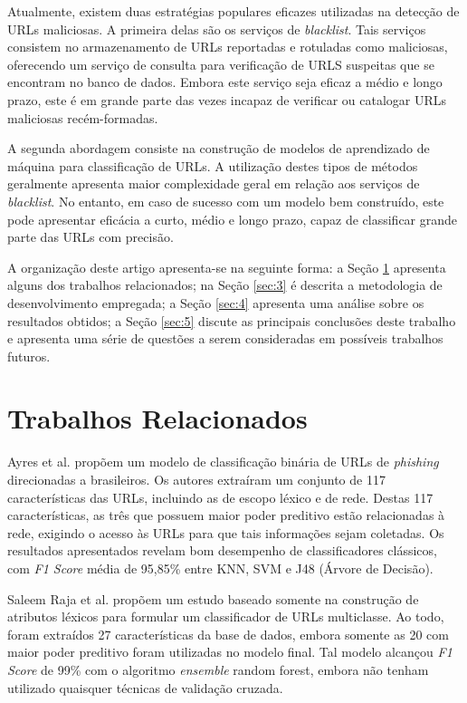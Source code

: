 \documentclass[manuscript,screen,review]{acmart}
\begin{document}

Atualmente, existem duas estratégias populares eficazes utilizadas na detecção de URLs maliciosas. A primeira delas são os serviços de \emph{blacklist}. Tais serviços consistem no armazenamento de URLs reportadas e rotuladas como maliciosas, oferecendo um serviço de consulta para verificação de URLS suspeitas que se encontram no banco de dados. Embora este serviço seja eficaz a médio e longo prazo, este é em grande parte das vezes incapaz de verificar ou catalogar URLs maliciosas recém-formadas.

A segunda abordagem consiste na construção de modelos de aprendizado de máquina para classificação de URLs. A utilização destes tipos de métodos geralmente apresenta maior complexidade geral em relação aos serviços de \emph{blacklist}. No entanto, em caso de sucesso com um modelo bem construído, este pode apresentar eficácia a curto, médio e longo prazo, capaz de classificar grande parte das URLs com precisão.

A organização deste artigo apresenta-se na seguinte forma: a Seção \ref{sec:2} apresenta alguns dos trabalhos relacionados; na Seção \ref{sec:3} é descrita a metodologia de desenvolvimento empregada; a Seção \ref{sec:4} apresenta uma análise sobre os resultados obtidos; a Seção \ref{sec:5} discute as principais conclusões deste trabalho e apresenta uma série de questões a serem consideradas em possíveis trabalhos futuros. 

\section{Trabalhos Relacionados} \label{sec:2}

Ayres et al. \cite{sbrc} propõem um modelo de classificação binária de URLs de \emph{phishing} direcionadas a brasileiros. Os autores extraíram um conjunto de 117 características das URLs, incluindo as de escopo léxico e de rede. Destas 117 características, as três que possuem maior poder preditivo estão relacionadas à rede, exigindo o acesso às URLs para que tais informações sejam coletadas. Os resultados apresentados revelam bom desempenho de classificadores clássicos, com \emph{F1 Score} média de 95,85\% entre KNN, SVM e J48 (Árvore de Decisão).

Saleem Raja et al. \cite{SALEEMRAJA2021163} propõem um estudo baseado somente na construção de atributos léxicos para formular um classificador de URLs multiclasse. Ao todo, foram extraídos 27 características da base de dados, embora somente as 20 com maior poder preditivo foram utilizadas no modelo final. Tal modelo alcançou \emph{F1 Score} de 99\% com o algoritmo \emph{ensemble} random forest, embora não tenham utilizado quaisquer técnicas de validação cruzada.
\end{document}
